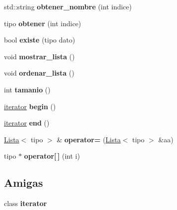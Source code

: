 \begin{DoxyCompactItemize}
std\+::string {\bfseries obtener\+\_\+nombre} (int indice)
\item 
\mbox{\label{classLista_a8ae71c3b813589c892ab1f4ff8edd753}} 
tipo {\bfseries obtener} (int indice)
\item 
\mbox{\label{classLista_a63f1a416d1bc0eb65b708f99cff25677}} 
bool {\bfseries existe} (tipo dato)
\item 
\mbox{\label{classLista_aafbee380012da3c38609361439625d96}} 
void {\bfseries mostrar\+\_\+lista} ()
\item 
\mbox{\label{classLista_aadd45f814bcad14746f775ba49a18dbe}} 
void {\bfseries ordenar\+\_\+lista} ()
\item 
\mbox{\label{classLista_aecd56566af6d1c85b7c9fa01f64e82e5}} 
int {\bfseries tamanio} ()
\item 
\mbox{\label{classLista_a12152cfb5d404d55ccc4d1a57194cf30}} 
\hyperlink{classLista_1_1iterator}{iterator} {\bfseries begin} ()
\item 
\mbox{\label{classLista_a0f1097e030d597d00a5c68768df7d09d}} 
\hyperlink{classLista_1_1iterator}{iterator} {\bfseries end} ()
\item 
\mbox{\label{classLista_ac93e2645445485ec58e7d08197fbd695}} 
\hyperlink{classLista}{Lista}$<$ tipo $>$ \& {\bfseries operator=} (\hyperlink{classLista}{Lista}$<$ tipo $>$ \&aa)
\item 
\mbox{\label{classLista_a24c88e2b3109fa5c001237f1ff52bafb}} 
tipo $\ast$ {\bfseries operator\mbox{[}$\,$\mbox{]}} (int i)
\end{DoxyCompactItemize}
\subsection*{Amigas}
\begin{DoxyCompactItemize}
\item 
\mbox{\label{classLista_a67171474c4da6cc8efe0c7fafefd2b2d}} 
class {\bfseries iterator}
\end{DoxyCompactItemize}


